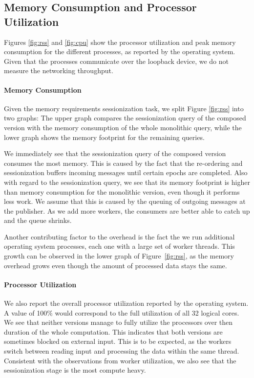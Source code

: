 \clearpage
\subsection{Memory Consumption and Processor Utilization}

Figures \ref{fig:rss} and \ref{fig:cpu} show the processor utilization and peak
memory consumption for the different processes, as reported by the operating
system. Given that the processes communicate over the loopback device,
we do not measure the networking throughput.

\paragraph{Memory Consumption}

Given the memory requirements sessionization task, we split Figure \ref{fig:rss}
into two graphs: The upper graph compares the sessionization query 
of the composed version with the memory consumption of the whole monolithic
query, while the lower graph shows the memory footprint for the remaining queries.

We immediately see that the sessionization query of the composed version
consumes the most memory. This is caused by the fact that the re-ordering
and sessionization buffers incoming messages until certain epochs are completed.
Also with regard to the sessionization query, we see that its memory footprint
is higher than memory consumption for the monolithic version, even though
it performs less work. We assume that this is caused by the queuing of
outgoing messages at the publisher. As we add more workers, the consumers are
better able to catch up and the queue shrinks.

Another contributing factor to the overhead is the fact the we run additional
operating system processes, each one with a large set of worker threads. This
growth can be observed in the lower graph of Figure~\ref{fig:rss}, as the
memory overhead grows even though the amount of processed data stays the same.

\paragraph{Processor Utilization}

We also report the overall processor utilization reported by the operating system.
A value of 100\% would correspond to the full utilization of all 32 logical cores.
We see that neither versions manage to fully utilize the processors over then duration of
the whole computation. This indicates that both versions are sometimes blocked
on external input. This is to be expected, as the workers switch between
reading input and processing the data within the same thread.
 Consistent with the observations from worker utilization, we
also see that the sessionization stage is the most compute heavy.


